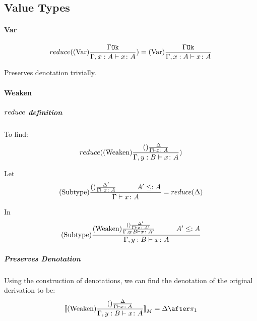 {        \subsection{Value Types}
            \paragraph{Var}
            \begin{equation}
                reduce((\text{Var}) \frac{\Gamma \texttt{Ok}}{\Gamma, x: A \vdash x \colon A}) =  (\text{Var}) \frac{\Gamma \texttt{Ok}}{\Gamma, x: A \vdash x \colon A}
            \end{equation}

            Preserves denotation trivially.

            \paragraph{Weaken}
            \subparagraph{$reduce$ definition}
            To find:
            \begin{equation}
                reduce((\text{Weaken}) \frac{(\text{}) \frac{\Delta}{\Gamma \vdash x \colon A}}{\Gamma, y: B \vdash x \colon A})
            \end{equation}

            Let 
            \begin{equation}\label{WeakenDeltaReduction}
                \treerule{Subtype}{\treerule{}{\D'}{\gtyperelation{x}{A}}\s\s A'\subtype A}{\gtyperelation{x}{A}} = \reduce(\D)
            \end{equation}

            In 
            \begin{equation}
                \treerule{Subtype}{
                \treerule{Weaken}{
                    \treerule{}{\D'}{\gtyperelation{x}{A'}}
                } {
                    \typerelation{\gby}{x}{A'}
                }
                \s\s
                A' \subtype A
                }{\typerelation{\gby}{x}{A}}
            \end{equation}

            \subparagraph{Preserves Denotation}
            Using the construction of denotations, we can find the denotation of the original derivation to be:
            \begin{equation}
                \deno{\treerule{Weaken}{\treerule{}{\D}{\gtyperelation{x}{A}}}{\typerelation{\gby}{x}{A}}} = \D \after \p
            \end{equation}

}
